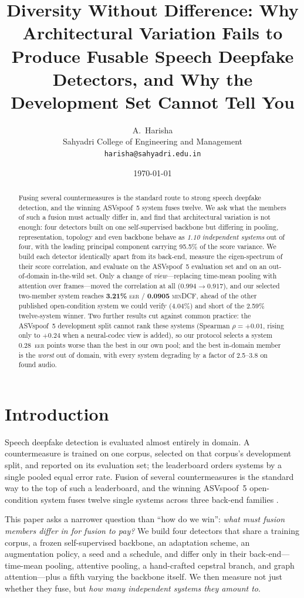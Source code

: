 \documentclass[11pt,a4paper]{article}
\title{\bf Diversity Without Difference: Why Architectural Variation Fails to
Produce Fusable Speech Deepfake Detectors, and Why the Development Set
Cannot Tell You}
\author{A.\ Harisha\\[2pt]
\small Sahyadri College of Engineering and Management\\
\small \texttt{harisha@sahyadri.edu.in}}
\date{\today}
\newcommand{\eer}{\textsc{eer}}
\newcommand{\mindcf}{\textsc{minDCF}}
\newcommand{\best}[1]{\textbf{#1}}
\begin{document}
\maketitle

\begin{abstract}
\noindent
Fusing several countermeasures is the standard route to strong speech deepfake detection, and the
winning ASVspoof~5 system fuses twelve.
We ask what the members of such a fusion must actually differ in, and find that architectural
variation is not enough: four detectors built on one self-supervised backbone but differing in
pooling, representation, topology and even backbone behave as \emph{1.10 independent systems} out
of four, with the leading principal component carrying 95.5\% of the score variance.
We build each detector identically apart from its back-end, measure the eigen-spectrum of their
score correlation, and evaluate on the ASVspoof~5 evaluation set and on an out-of-domain
in-the-wild set.
Only a change of \emph{view}---replacing time-mean pooling with attention over frames---moved the
correlation at all ($0.994 \rightarrow 0.917$), and our selected two-member system reaches
\best{3.21\%} \eer{} / \best{0.0905} \mindcf{}, ahead of the other published open-condition system
we could verify (4.04\%) and short of the 2.59\% twelve-system winner.
Two further results cut against common practice: the ASVspoof~5 development split cannot rank these
systems (Spearman $\rho = +0.01$, rising only to $+0.24$ when a neural-codec view is added), so our
protocol selects a system 0.28~\eer{} points worse than the best in our own pool; and the
best in-domain member is the \emph{worst} out of domain, with every system degrading by a factor of
2.5--3.8 on found audio.
\end{abstract}

\section{Introduction}

Speech deepfake detection is evaluated almost entirely in domain. A countermeasure is trained on one
corpus, selected on that corpus's development split, and reported on its evaluation set; the
leaderboard orders systems by a single pooled equal error rate. Fusion of several countermeasures is
the standard way to the top of such a leaderboard, and the winning ASVspoof~5 open-condition system
fuses twelve single systems across three back-end families \citep{ustc2024}.

This paper asks a narrower question than ``how do we win'': \emph{what must fusion members differ in
for fusion to pay?} We build four detectors that share a training corpus, a frozen self-supervised
backbone, an adaptation scheme, an augmentation policy, a seed and a schedule, and differ only in
their back-end---time-mean pooling, attentive pooling, a hand-crafted cepstral branch, and graph
attention---plus a fifth varying the backbone itself. We then measure not just whether they fuse,
but \emph{how many independent systems they amount to}.
\end{document}
